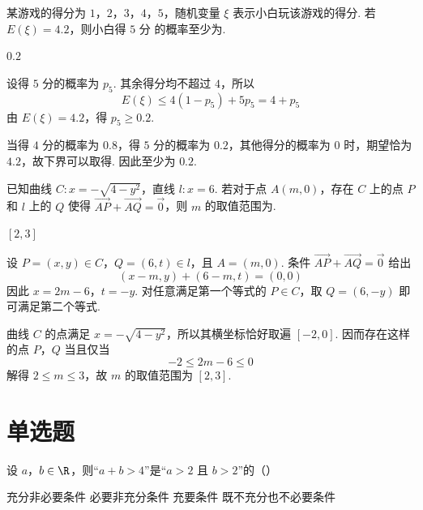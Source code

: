 \begin{problem}
某游戏的得分为 \(1\)，\(2\)，\(3\)，\(4\)，\(5\)，随机变量 \(\xi\) 表示小白玩该游戏的得分. 若 \(E(\xi) = 4.2\)，则小白得 \(5\text{ 分}\) 的概率至少为\fillinblank{}.
\end{problem}

\begin{answer}
\(0.2\)
\end{answer}

\begin{solution}
设得 \(5\) 分的概率为 \(p_5\). 其余得分均不超过 \(4\)，所以
\[
E(\xi)\leqslant4(1-p_5)+5p_5=4+p_5
\]
由 \(E(\xi)=4.2\)，得 \(p_5\geqslant0.2\).

当得 \(4\) 分的概率为 \(0.8\)，得 \(5\) 分的概率为 \(0.2\)，其他得分的概率为 \(0\) 时，期望恰为 \(4.2\)，故下界可以取得. 因此至少为 \(0.2\).
\end{solution}

\begin{problem}
已知曲线 \(C: x = -\sqrt{4 - y^2}\)，直线 \(l: x = 6\). 若对于点 \(A(m,0)\)，存在 \(C\) 上的点 \(P\) 和 \(l\) 上的 \(Q\) 使得 \(\overrightarrow{AP} + \overrightarrow{AQ} = \overrightarrow{0}\)，则 \(m\) 的取值范围为\fillinblank{}.
\end{problem}

\begin{answer}
\([2,3]\)
\end{answer}

\begin{solution}
设 \(P=(x,y)\in C\)，\(Q=(6,t)\in l\)，且 \(A=(m,0)\). 条件
\(\overrightarrow{AP}+\overrightarrow{AQ}=\overrightarrow0\) 给出
\[
(x-m,y)+(6-m,t)=(0,0)
\]
因此
\(x=2m-6\)，\(t=-y\).
对任意满足第一个等式的 \(P\in C\)，取 \(Q=(6,-y)\) 即可满足第二个等式.

曲线 \(C\) 的点满足 \(x=-\sqrt{4-y^2}\)，所以其横坐标恰好取遍 \([-2,0]\). 因而存在这样的点 \(P\)，\(Q\) 当且仅当
\[
-2\leqslant2m-6\leqslant0
\]
解得 \(2\leqslant m\leqslant3\)，故 \(m\) 的取值范围为 \([2,3]\).
\end{solution}

\section{单选题}

\begin{problem}
设 \(a\)，\(b \in \R\)，则“\(a + b > 4\)”是“\(a > 2\) 且 \(b > 2\)”的（\quad）

\choices
    {充分非必要条件}
    {必要非充分条件}
    {充要条件}
    {既不充分也不必要条件}
\end{problem}

